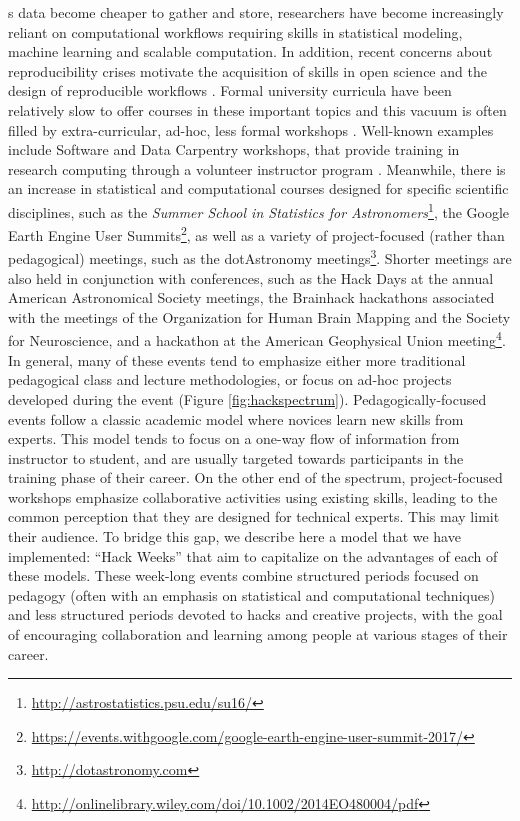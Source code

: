 \label{sec:introduction}
s data become cheaper to gather and store, researchers have become increasingly reliant on computational workflows requiring skills in statistical modeling, machine learning and scalable computation. In addition, recent concerns about reproducibility crises motivate the acquisition of skills in open science and the design of reproducible workflows \cite[e.g.][]{pashler2012,baker2016}.
Formal university curricula have been relatively slow to offer courses in these important topics and this vacuum is often filled by extra-curricular, ad-hoc, less formal workshops \cite{demasi2017}.
Well-known examples include Software and Data Carpentry workshops, that provide training in research computing through a volunteer instructor program \cite{b:wilson-swc-lessons-2016,teal2015data}.
Meanwhile, there is an increase in statistical and computational courses designed for specific scientific disciplines, such as the \textit{Summer School in Statistics for Astronomers}\footnote{\url{http://astrostatistics.psu.edu/su16/}}, the Google Earth Engine User Summits\footnote{\url{https://events.withgoogle.com/google-earth-engine-user-summit-2017/}}, as well as a variety of project-focused (rather than pedagogical) meetings, such as the dotAstronomy meetings\footnote{\url{http://dotastronomy.com}}.
Shorter meetings are also held in conjunction with conferences, such as the Hack Days at the annual American Astronomical Society meetings, the Brainhack hackathons associated with the meetings of the Organization for Human Brain Mapping and the Society for Neuroscience\cite{Cameron_Craddock2016-wc}, and a hackathon at the American Geophysical Union meeting\footnote{\url{http://onlinelibrary.wiley.com/doi/10.1002/2014EO480004/pdf}}.
In general, many of these events tend to emphasize either more traditional pedagogical class and lecture methodologies, or focus on ad-hoc projects developed during the event (Figure \ref{fig:hackspectrum}).
Pedagogically-focused events follow a classic academic model where novices learn new skills from experts. This model tends to focus on a one-way flow of information from instructor to student, and are usually targeted towards participants in the training phase of their career. On the other end of the spectrum, project-focused workshops emphasize collaborative activities using existing skills, leading to the common perception that they are designed for technical experts. This may limit their audience.
To bridge this gap, we describe here a model that we have implemented: ``Hack Weeks'' that aim to capitalize on the advantages of each of these models.
These week-long events combine structured periods focused on pedagogy (often with an emphasis on statistical and computational techniques) and less structured periods devoted to hacks and creative projects, with the goal of encouraging collaboration and learning among people at various stages of their career.

